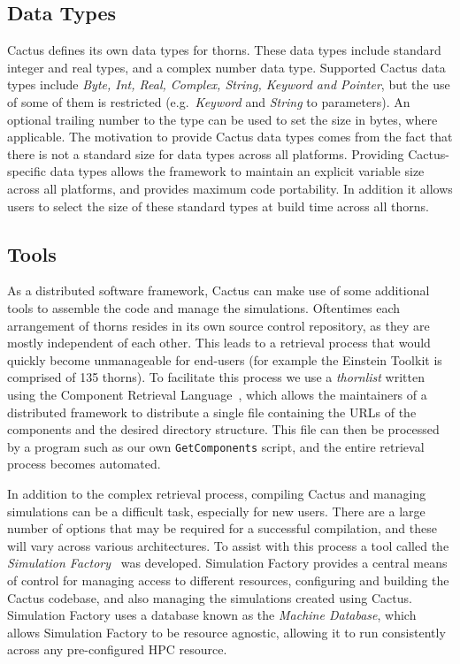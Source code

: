 \documentclass[conference]{IEEEtran}
\begin{document}
\subsection{Data Types}
Cactus defines its own data types for thorns. These data types include standard integer and real types, and a complex number data type.
Supported Cactus data types include \emph{Byte, Int, Real, Complex, String, Keyword and Pointer},
but the use of some of them is restricted (e.g.\ \emph{Keyword}
and \emph{String} to parameters).
An optional trailing number to the type 
can be used to set the size in bytes, where applicable.
The motivation to provide Cactus data types comes from 
the fact that there is not a standard size for data types across all platforms. Providing Cactus-specific
data types allows the framework to maintain an explicit variable size across all platforms, and provides
maximum code portability. In addition it allows users to select the size of these
standard types at build time across all thorns.

\subsection{Tools}

As a distributed software framework, Cactus can make use of some additional tools to assemble the code and 
manage the simulations. Oftentimes each arrangement of thorns resides in its own source control repository, as they are mostly
independent of each other. This leads to a retrieval process that would quickly become
unmanageable for end-users (for example the Einstein Toolkit is comprised of 135 thorns). To facilitate this
process we use a \emph{thornlist} written using the Component Retrieval Language~\cite{TG_CRL}, which allows the maintainers of a 
distributed framework to distribute a single file containing the URLs of the components and the
desired directory structure. This file can then be processed by a program such as our own 
\texttt{GetComponents} script, and the entire retrieval process becomes automated.

In addition to the complex retrieval process,
compiling Cactus and managing simulations
can be a difficult task, especially for new users. There are a large number of options that may
be required for a successful compilation, and these will vary across various architectures. To assist
with this process a tool called the \emph{Simulation
  Factory}~\cite{ES-simfactoryweb, CBHPC_SimFactory} was 
developed. Simulation Factory provides a central means of control for managing access to different 
resources, configuring and building the Cactus codebase, and also managing the simulations 
created using Cactus. Simulation Factory uses a database known as the \emph{Machine Database}, 
which allows Simulation Factory to be resource agnostic, allowing it to run consistently across any 
pre-configured HPC resource.
\end{document}
